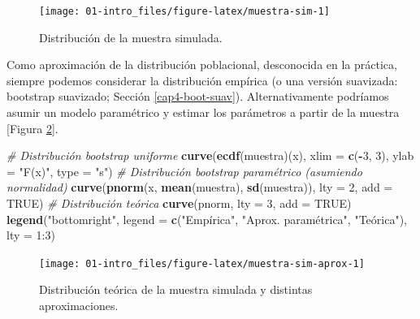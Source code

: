 \documentclass[]{book}
\newenvironment{Shaded}{\begin{snugshade}}{\end{snugshade}}
\newcommand{\KeywordTok}[1]{\textcolor[rgb]{0.13,0.29,0.53}{\textbf{#1}}}
\newcommand{\DataTypeTok}[1]{\textcolor[rgb]{0.13,0.29,0.53}{#1}}
\newcommand{\DecValTok}[1]{\textcolor[rgb]{0.00,0.00,0.81}{#1}}
\newcommand{\StringTok}[1]{\textcolor[rgb]{0.31,0.60,0.02}{#1}}
\newcommand{\CommentTok}[1]{\textcolor[rgb]{0.56,0.35,0.01}{\textit{#1}}}
\newcommand{\OtherTok}[1]{\textcolor[rgb]{0.56,0.35,0.01}{#1}}
\newcommand{\OperatorTok}[1]{\textcolor[rgb]{0.81,0.36,0.00}{\textbf{#1}}}
\newcommand{\NormalTok}[1]{#1}
\theoremstyle{definition}
\theoremstyle{definition}
\theoremstyle{definition}
\theoremstyle{remark}
\begin{document}
\begin{figure}[!htb]

{\centering \texttt{[image: 01-intro\_files/figure-latex/muestra-sim-1]} 

}

\caption{Distribución de la muestra simulada.}\label{fig:muestra-sim}
\end{figure}

Como aproximación de la distribución poblacional, desconocida en la
práctica, siempre podemos considerar la distribución empírica (o una
versión suavizada: bootstrap suavizado; Sección \ref{cap4-boot-suav}).
Alternativamente podríamos asumir un modelo paramétrico y estimar los
parámetros a partir de la muestra {[}Figura
\ref{fig:muestra-sim-aprox}{]}.

\begin{Shaded}
\begin{Highlighting}[]
\CommentTok{# Distribución bootstrap uniforme}
\KeywordTok{curve}\NormalTok{(}\KeywordTok{ecdf}\NormalTok{(muestra)(x), }\DataTypeTok{xlim =} \KeywordTok{c}\NormalTok{(}\OperatorTok{-}\DecValTok{3}\NormalTok{, }\DecValTok{3}\NormalTok{), }\DataTypeTok{ylab =} \StringTok{"F(x)"}\NormalTok{, }\DataTypeTok{type =} \StringTok{"s"}\NormalTok{)}
\CommentTok{# Distribución bootstrap paramétrico (asumiendo normalidad)}
\KeywordTok{curve}\NormalTok{(}\KeywordTok{pnorm}\NormalTok{(x, }\KeywordTok{mean}\NormalTok{(muestra), }\KeywordTok{sd}\NormalTok{(muestra)), }\DataTypeTok{lty =} \DecValTok{2}\NormalTok{, }\DataTypeTok{add =} \OtherTok{TRUE}\NormalTok{)}
\CommentTok{# Distribución teórica}
\KeywordTok{curve}\NormalTok{(pnorm, }\DataTypeTok{lty =} \DecValTok{3}\NormalTok{, }\DataTypeTok{add =} \OtherTok{TRUE}\NormalTok{)}
\KeywordTok{legend}\NormalTok{(}\StringTok{"bottomright"}\NormalTok{, }\DataTypeTok{legend =} \KeywordTok{c}\NormalTok{(}\StringTok{"Empírica"}\NormalTok{, }\StringTok{"Aprox. paramétrica"}\NormalTok{, }\StringTok{"Teórica"), lty = 1:3)}
\end{Highlighting}
\end{Shaded}

\begin{figure}[!htb]

{\centering \texttt{[image: 01-intro\_files/figure-latex/muestra-sim-aprox-1]} 

}

\caption{Distribución teórica de la muestra simulada y distintas aproximaciones.}\label{fig:muestra-sim-aprox}
\end{figure}
\end{document}
